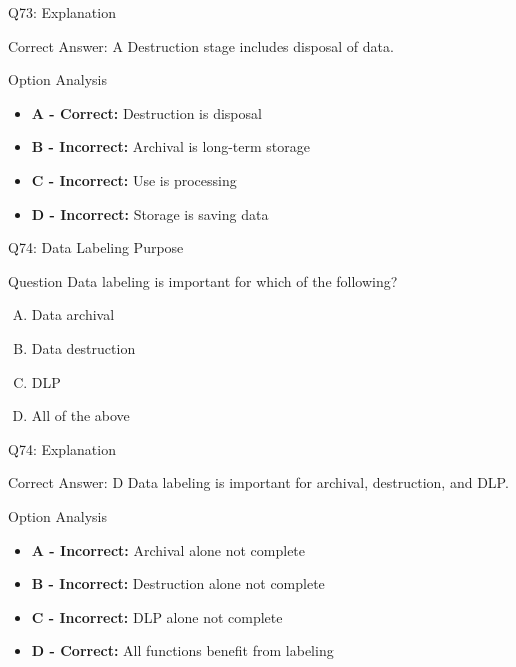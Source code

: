 \documentclass{beamer}
\begin{document}
	\begin{frame}{Q73: Explanation}
		\begin{block}{Correct Answer: A}
			Destruction stage includes disposal of data.
		\end{block}
		\begin{block}{Option Analysis}
			\begin{itemize}
				\item \textbf{A - Correct:} Destruction is disposal
				\item \textbf{B - Incorrect:} Archival is long-term storage
				\item \textbf{C - Incorrect:} Use is processing
				\item \textbf{D - Incorrect:} Storage is saving data
			\end{itemize}
		\end{block}
	\end{frame}
	
	\begin{frame}{Q74: Data Labeling Purpose}
		\begin{block}{Question}
			Data labeling is important for which of the following?
		\end{block}
		\begin{enumerate}[(A)]
			\item Data archival
			\item Data destruction
			\item DLP
			\item All of the above
		\end{enumerate}
	\end{frame}
	
	\begin{frame}{Q74: Explanation}
		\begin{block}{Correct Answer: D}
			Data labeling is important for archival, destruction, and DLP.
		\end{block}
		\begin{block}{Option Analysis}
			\begin{itemize}
				\item \textbf{A - Incorrect:} Archival alone not complete
				\item \textbf{B - Incorrect:} Destruction alone not complete
				\item \textbf{C - Incorrect:} DLP alone not complete
				\item \textbf{D - Correct:} All functions benefit from labeling
			\end{itemize}
		\end{block}
	\end{frame}
	
\end{document}
